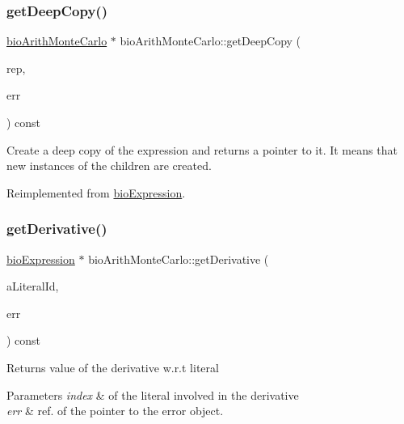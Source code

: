 \subsubsection{\texorpdfstring{get\+Deep\+Copy()}{getDeepCopy()}}
{\footnotesize\ttfamily \hyperlink{classbio_arith_monte_carlo}{bio\+Arith\+Monte\+Carlo} $\ast$ bio\+Arith\+Monte\+Carlo\+::get\+Deep\+Copy (\begin{DoxyParamCaption}\item[{\hyperlink{classbio_expression_repository}{bio\+Expression\+Repository} $\ast$}]{rep,  }\item[{pat\+Error $\ast$\&}]{err }\end{DoxyParamCaption}) const\hspace{0.3cm}{\ttfamily [virtual]}}

Create a deep copy of the expression and returns a pointer to it. It means that new instances of the children are created. 

Reimplemented from \hyperlink{classbio_expression_a4ee1b8add634078a02eaae26cd40dcc8}{bio\+Expression}.

\mbox{\label{classbio_arith_monte_carlo_aae0ac80f1c463af6e6d1c3b227bae1e1}} 
\subsubsection{\texorpdfstring{get\+Derivative()}{getDerivative()}}
{\footnotesize\ttfamily \hyperlink{classbio_expression}{bio\+Expression} $\ast$ bio\+Arith\+Monte\+Carlo\+::get\+Derivative (\begin{DoxyParamCaption}\item[{pat\+U\+Long}]{a\+Literal\+Id,  }\item[{pat\+Error $\ast$\&}]{err }\end{DoxyParamCaption}) const\hspace{0.3cm}{\ttfamily [virtual]}}

\begin{DoxyReturn}{Returns}
value of the derivative w.\+r.\+t literal 
\end{DoxyReturn}

\begin{DoxyParams}{Parameters}
{\em index} & of the literal involved in the derivative \\
\hline
{\em err} & ref. of the pointer to the error object. \\
\hline
\end{DoxyParams}


